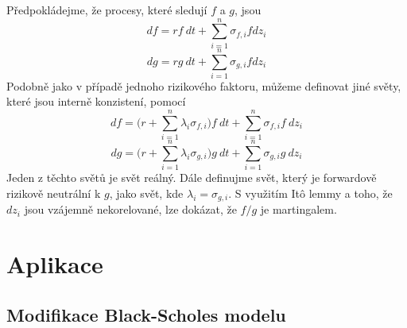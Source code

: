 \documentclass[a4paper]{book}
\begin{document}
Předpokládejme, že procesy, které sledují $f$ a $g$, jsou
\begin{equation*}
df = rf\ dt + \sum^n_{i=1}\sigma_{f,i}fdz_i
\end{equation*}
\begin{equation*}
dg = rg\ dt + \sum^n_{i=1}\sigma_{g,i}fdz_i
\end{equation*}
Podobně jako v případě jednoho rizikového faktoru, můžeme definovat jiné světy, které jsou interně konzistení, pomocí
\begin{equation*}
df = \Bigg( r + \sum^n_{i=1}\lambda_i \sigma_{f,i} \Bigg)f\ dt+ \sum^n_{i=1}\sigma_{f,i}f\ dz_i
\end{equation*}
\begin{equation*}
dg = \Bigg( r + \sum^n_{i=1}\lambda_i \sigma_{g,i} \Bigg)g\ dt + \sum^n_{i=1}\sigma_{g,i}g\ dz_i
\end{equation*}
Jeden z těchto světů je svět reálný. Dále definujme svět, který je forwardově rizikově neutrální k $g$, jako svět, kde $\lambda_i = \sigma_{g,i}$. S využitím It\^o lemmy a toho, že $dz_i$ jsou vzájemně nekorelované, lze dokázat, že $f/g$ je martingalem.

\section{Aplikace}

\subsection{Modifikace Black-Scholes modelu}
\end{document}
